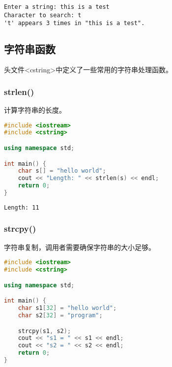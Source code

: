 \begin{tcolorbox}
	\begin{verbatim}
Enter a string: this is a test
Character to search: t
't' appears 3 times in "this is a test".
	\end{verbatim}
\end{tcolorbox}

\vspace{0.5cm}

\subsection{字符串函数}

头文件<cstring>中定义了一些常用的字符串处理函数。

\subsubsection{strlen()}

计算字符串的长度。\\


\begin{lstlisting}[language=C++]
#include <iostream>
#include <cstring>

using namespace std;

int main() {
	char s[] = "hello world";
	cout << "Length: " << strlen(s) << endl;
	return 0;
}
\end{lstlisting}

\begin{tcolorbox}
	\begin{verbatim}
Length: 11
	\end{verbatim}
\end{tcolorbox}

\vspace{0.5cm}

\subsubsection{strcpy()}

字符串复制，调用者需要确保字符串的大小足够。\\


\begin{lstlisting}[language=C++]
#include <iostream>
#include <cstring>

using namespace std;

int main() {
	char s1[32] = "hello world";
	char s2[32] = "program";

	strcpy(s1, s2);
	cout << "s1 = " << s1 << endl;
	cout << "s2 = " << s2 << endl;
	return 0;
}
\end{lstlisting}

